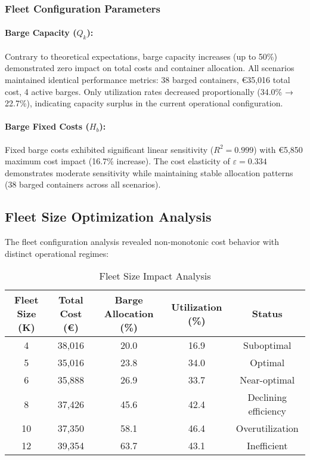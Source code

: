 \documentclass[12pt,a4paper]{article}
\begin{document}
\subsubsection{Fleet Configuration Parameters}

\paragraph{Barge Capacity ($Q_k$):}
Contrary to theoretical expectations, barge capacity increases (up to 50\%) demonstrated zero impact on total costs and container allocation. All scenarios maintained identical performance metrics: 38 barged containers, €35,016 total cost, 4 active barges. Only utilization rates decreased proportionally (34.0\% → 22.7\%), indicating capacity surplus in the current operational configuration.

\paragraph{Barge Fixed Costs ($H_b$):}
Fixed barge costs exhibited significant linear sensitivity ($R^2 = 0.999$) with €5,850 maximum cost impact (16.7\% increase). The cost elasticity of $\varepsilon = 0.334$ demonstrates moderate sensitivity while maintaining stable allocation patterns (38 barged containers across all scenarios).

\subsection{Fleet Size Optimization Analysis}

The fleet configuration analysis revealed non-monotonic cost behavior with distinct operational regimes:

\begin{table}[H]
\centering
\caption{Fleet Size Impact Analysis}
\begin{tabular}{@{}ccccc@{}}
\toprule
Fleet Size (K) & Total Cost (€) & Barge Allocation (\%) & Utilization (\%) & Status \\
\midrule
4 & 38,016 & 20.0 & 16.9 & Suboptimal \\
5 & 35,016 & 23.8 & 34.0 & Optimal \\
6 & 35,888 & 26.9 & 33.7 & Near-optimal \\
8 & 37,426 & 45.6 & 42.4 & Declining efficiency \\
10 & 37,350 & 58.1 & 46.4 & Overutilization \\
12 & 39,354 & 63.7 & 43.1 & Inefficient \\
\bottomrule
\end{tabular}
\end{table}
\end{document}
